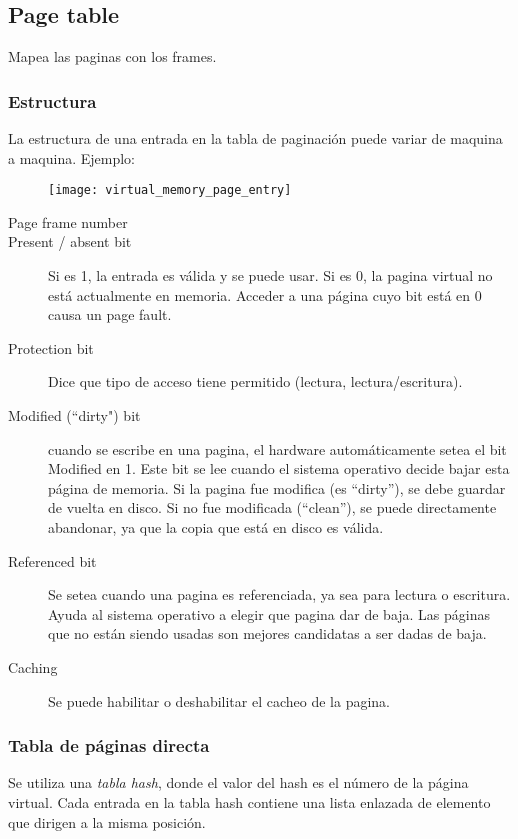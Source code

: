 \documentclass[a4paper, twoside]{article}
\begin{document}
\subsection{Page table}
Mapea las paginas con los frames.
\subsubsection{Estructura}
La estructura de una entrada en la tabla de paginación puede variar de maquina a maquina.
Ejemplo:
\begin{figure}[H]
	\centering
	\texttt{[image: virtual\_memory\_page\_entry]}
	\label{fig:virtual_memory_page_entry}
\end{figure}

\begin{description}
	\item[Page frame number]
	\item[Present / absent bit] Si es 1, la entrada es válida y se puede usar. Si es 0, la pagina virtual no está actualmente en memoria. Acceder a una página cuyo bit está en 0 causa un page fault.
	\item[Protection bit] Dice que tipo de acceso tiene permitido (lectura, lectura/escritura).
	\item[Modified (“dirty") bit] cuando se escribe en una pagina, el hardware automáticamente setea el bit Modified en 1. Este bit se lee cuando el sistema operativo decide bajar esta página de memoria. Si la pagina fue modifica (es “dirty”), se debe guardar de vuelta en disco. Si no fue modificada (“clean”), se puede directamente abandonar, ya que la copia que está en disco es válida.
	\item[Referenced bit] Se setea cuando una pagina es referenciada, ya sea para lectura o escritura. Ayuda al sistema operativo a elegir que pagina dar de baja. Las páginas que no están siendo usadas son mejores candidatas a ser dadas de baja.
	\item[Caching] Se puede habilitar o deshabilitar el cacheo de la pagina.
\end{description}

\subsubsection{Tabla de páginas directa}
Se utiliza una \emph{tabla hash}, donde el valor del hash es el número de la página virtual. Cada entrada en la tabla hash contiene una lista enlazada de elemento que dirigen a la misma posición.
\end{document}
